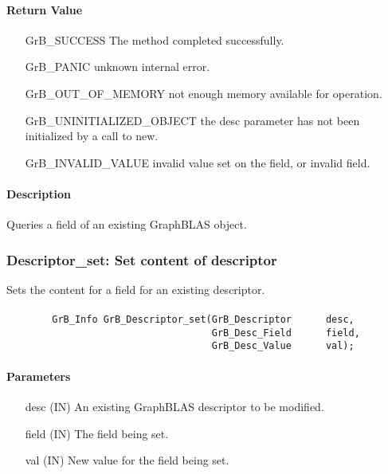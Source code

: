 \paragraph{Return Value}

\begin{itemize}[leftmargin=2.1in]
\item[{\sf GrB\_SUCCESS}]  The method completed successfully.
\item[{\sf GrB\_PANIC}]             unknown internal error.
\item[{\sf GrB\_OUT\_OF\_MEMORY}]          not enough memory available for operation.
\item[{\sf GrB\_UNINITIALIZED\_OBJECT}]          the {\sf desc} parameter has not been
                                    initialized by a call to {\sf new}.
\item[{\sf GrB\_INVALID\_VALUE}]    invalid value set on the field, or invalid field.
\end{itemize}

\paragraph{Description}

Queries a field of an existing GraphBLAS object. 


\subsubsection{{\sf Descriptor\_set}: Set content of descriptor}

Sets the content for a field for an existing descriptor.

\paragraph{\syntax}

\begin{verbatim}
        GrB_Info GrB_Descriptor_set(GrB_Descriptor      desc,
                                    GrB_Desc_Field      field,
                                    GrB_Desc_Value      val);
\end{verbatim}

\paragraph{Parameters}

\begin{itemize}[leftmargin=1.1in]
    \item[{\sf desc}]  ({\sf IN}) An existing GraphBLAS descriptor to be modified.
    \item[{\sf field}] ({\sf IN}) The field being set.
    \item[{\sf val}]   ({\sf IN}) New value for the field being set.
\end{itemize}


